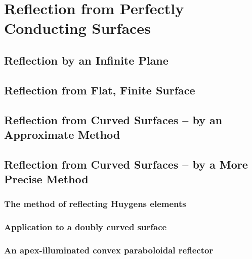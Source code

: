 \chapter{Reflection from Perfectly Conducting Surfaces}
\label{ch:refcond}

\section{Reflection by an Infinite Plane}

\section{Reflection from Flat, Finite Surface}

\section{Reflection from Curved Surfaces -- by an Approximate Method}

\section{Reflection from Curved Surfaces -- by a More Precise Method}
\subsection{The method of reflecting Huygens elements}
\subsection{Application to a doubly curved surface}
\subsection{An apex-illuminated convex paraboloidal reflector}
